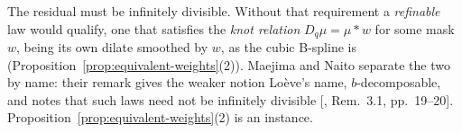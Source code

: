 The residual must be infinitely divisible. Without that requirement a \emph{refinable} law would
qualify, one that satisfies the \emph{knot relation} $D_q\mu = \mu * w$ for some mask $w$, being its
own dilate smoothed by $w$, as the cubic B-spline is (Proposition~\ref{prop:equivalent-weights}(2)).
Maejima and Naito separate the two by name: their remark gives the weaker notion Lo\`eve's name,
$b$-decomposable, and notes that such laws need not be infinitely divisible
[, Rem.~3.1, pp.~19--20]. Proposition~\ref{prop:equivalent-weights}(2) is an
instance.

